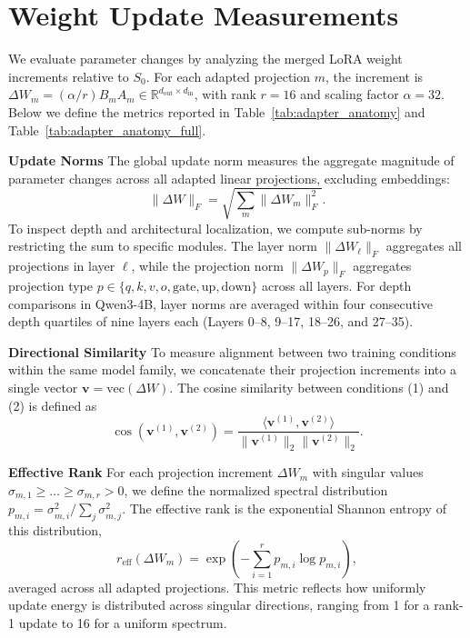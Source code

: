 \documentclass[]{template}
\theoremstyle{plain}
\theoremstyle{definition}
\theoremstyle{remark}
\renewcommand{\paragraph}[1]{\vspace{1mm}\noindent\textbf{#1}}
\begin{document}
\section{Weight Update Measurements}
\label{sec:adapter_metrics}
We evaluate parameter changes by analyzing the merged LoRA weight increments relative to $S_0$. For each adapted projection $m$, the increment is $\Delta W_m = (\alpha/r) B_m A_m \in \mathbb{R}^{d_{\mathrm{out}} \times d_{\mathrm{in}}}$, with rank $r=16$ and scaling factor $\alpha=32$. Below we define the metrics reported in Table~\ref{tab:adapter_anatomy} and Table~\ref{tab:adapter_anatomy_full}.

\paragraph{Update Norms}
The global update norm measures the aggregate magnitude of parameter changes across all adapted linear projections, excluding embeddings:
\begin{equation}
    \|\Delta W\|_F = \sqrt{\sum_m \|\Delta W_m\|_F^2}.
\end{equation}
To inspect depth and architectural localization, we compute sub-norms by restricting the sum to specific modules. The layer norm $\|\Delta W_\ell\|_F$ aggregates all projections in layer $\ell$, while the projection norm $\|\Delta W_p\|_F$ aggregates projection type $p \in \{q, k, v, o, \text{gate}, \text{up}, \text{down}\}$ across all layers. For depth comparisons in Qwen3-4B, layer norms are averaged within four consecutive depth quartiles of nine layers each (Layers 0--8, 9--17, 18--26, and 27--35).


\paragraph{Directional Similarity}
To measure alignment between two training conditions within the same model family, we concatenate their projection increments into a single vector $\mathbf{v} = \mathrm{vec}(\Delta W)$. The cosine similarity between conditions (1) and (2) is defined as
\begin{equation}
    \cos(\mathbf{v}^{(1)}, \mathbf{v}^{(2)}) = \frac{\langle \mathbf{v}^{(1)}, \mathbf{v}^{(2)} \rangle}{\|\mathbf{v}^{(1)}\|_2 \|\mathbf{v}^{(2)}\|_2}.
\end{equation}

\paragraph{Effective Rank}
For each projection increment $\Delta W_m$ with singular values $\sigma_{m,1} \ge \dots \ge \sigma_{m,r} > 0$, we define the normalized spectral distribution $p_{m,i} = \sigma_{m,i}^2 / \sum_j \sigma_{m,j}^2$. The effective rank is the exponential Shannon entropy of this distribution,
\begin{equation}
    r_{\mathrm{eff}}(\Delta W_m) = \exp\left(-\sum_{i=1}^r p_{m,i} \log p_{m,i}\right),
\end{equation}
averaged across all adapted projections. This metric reflects how uniformly update energy is distributed across singular directions, ranging from 1 for a rank-1 update to 16 for a uniform spectrum.
\end{document}
